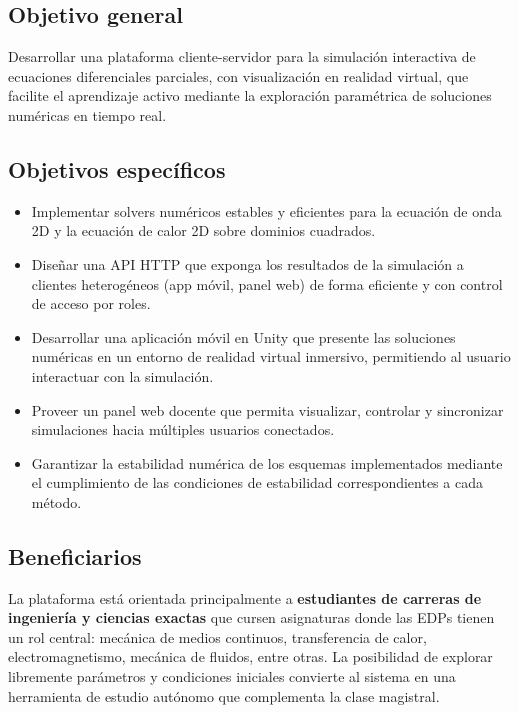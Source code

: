\documentclass[12pt, a4paper]{article}
\begin{document}
\subsection{Objetivo general}

Desarrollar una plataforma cliente-servidor para la simulación interactiva de
ecuaciones diferenciales parciales, con visualización en realidad virtual, que
facilite el aprendizaje activo mediante la exploración paramétrica de soluciones
numéricas en tiempo real.

\subsection{Objetivos específicos}

\begin{itemize}
    \item Implementar solvers numéricos estables y eficientes para la ecuación de onda
    2D y la ecuación de calor 2D sobre dominios cuadrados.

    \item Diseñar una API HTTP que exponga los resultados de la simulación a clientes
    heterogéneos (app móvil, panel web) de forma eficiente y con control de acceso por
    roles.

    \item Desarrollar una aplicación móvil en Unity que presente las soluciones
    numéricas en un entorno de realidad virtual inmersivo, permitiendo al usuario
    interactuar con la simulación.

    \item Proveer un panel web docente que permita visualizar, controlar y sincronizar
    simulaciones hacia múltiples usuarios conectados.

    \item Garantizar la estabilidad numérica de los esquemas implementados mediante el
    cumplimiento de las condiciones de estabilidad correspondientes a cada método.
\end{itemize}

\subsection{Beneficiarios}

La plataforma está orientada principalmente a \textbf{estudiantes de carreras de
ingeniería y ciencias exactas} que cursen asignaturas donde las EDPs tienen un rol
central: mecánica de medios continuos, transferencia de calor, electromagnetismo,
mecánica de fluidos, entre otras. La posibilidad de explorar libremente parámetros y
condiciones iniciales convierte al sistema en una herramienta de estudio autónomo que
complementa la clase magistral.
\end{document}
